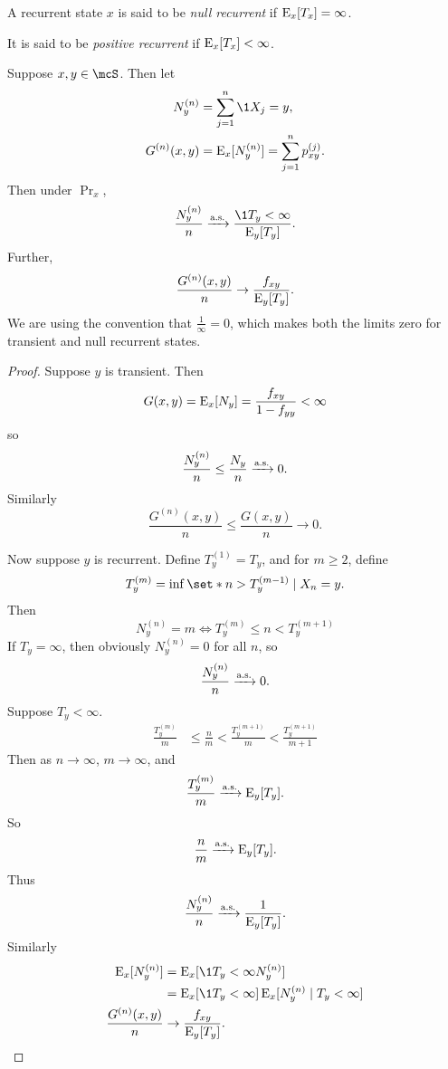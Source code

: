 \begin{definition*}
    A recurrent state $x$ is said to be \emph{null recurrent} if
    $\operatorname{\mathrm{E}}_x[T_x] = \infty$.

    It is said to be \emph{positive recurrent} if $\operatorname{\mathrm{E}}_x[T_x] < \infty$.
\end{definition*}

\begin{theorem*}
    Suppose $x, y \in \mcS$.
    Then let \begin{align*}
        N_y^{(n)} &= \sum_{j=1}^{n} \1{X_j = y}, \\
        G^{(n)}(x, y) &= \E_x[N_y^{(n)}] = \sum_{j=1}^{n} p_{xy}^{(j)}.
    \end{align*}
    Then under $\Pr_x$, \[
        \frac{N_y^{(n)}}{n} \asto \dfrac{\1{T_y < \infty}}{\E_y[T_y]}.
    \] Further, \[
        \frac{G^{(n)}(x, y)}{n} \to \dfrac{f_{xy}}{\operatorname{\mathrm{E}}_y[T_y]}.
    \]
    We are using the convention that $\frac{1}{\infty} = 0$, which makes
    both the limits zero for transient and null recurrent states.
\end{theorem*}
\begin{proof}
    Suppose $y$ is transient.
    Then \[
        G(x, y) = \operatorname{\mathrm{E}}_x[N_y] = \frac{f_{xy}}{1 - f_{yy}} < \infty
    \] so \[
        \frac{N_y^{(n)}}{n} \le \frac{N_y}{n} \xrightarrow{\text{a.s.}} 0.
    \] Similarly \[
        \frac{G^{(n)}(x, y)}{n} \le \frac{G(x, y)}{n} \to 0.
    \]

    Now suppose $y$ is recurrent.
    Define $T_y^{(1)} = T_y$, and for $m \ge 2$, define \[
        T_y^{(m)} = \inf\set*{n > T_y^{(m-1)} \mid X_n = y}.
    \] Then \[
        N_y^{(n)} = m \iff T_y^{(m)} \le n < T_y^{(m+1)}
    \]
    If $T_y = \infty$, then obviously $N_y^{(n)} = 0$ for all $n$, so \[
        \frac{N_y^{(n)}}{n} \xrightarrow{\text{a.s.}} 0.
    \] Suppose $T_y < \infty$.
    \begin{align*}
        \frac{T_y^{(m)}}{m} &\le \frac{n}{m} < \frac{T_y^{(m+1)}}{m}
                                        < \frac{T_y^{(m+1)}}{m+1}
    \end{align*}
    Then as $n \to \infty$, $m \to \infty$, and \[
        \frac{T_y^{(m)}}{m} \xrightarrow{\text{a.s.}} \operatorname{\mathrm{E}}_y[T_y].
    \] So \[
        \frac{n}{m} \xrightarrow{\text{a.s.}} \operatorname{\mathrm{E}}_y[T_y].
    \]
    Thus \[
        \frac{N_y^{(n)}}{n} \xrightarrow{\text{a.s.}} \frac{1}{\operatorname{\mathrm{E}}_y[T_y]}.
    \] Similarly \begin{align*}
        \E_x[N_y^{(n)}] &= \E_x[\1{T_y < \infty} N_y^{(n)}] \\
        &= \E_x[\1{T_y < \infty}] \E_x[N_y^{(n)} \mid T_y < \infty] \\
        \frac{G^{(n)}(x, y)}{n} &\to \frac{f_{xy}}{\E_y[T_y]}. \qedhere
    \end{align*}
\end{proof}

